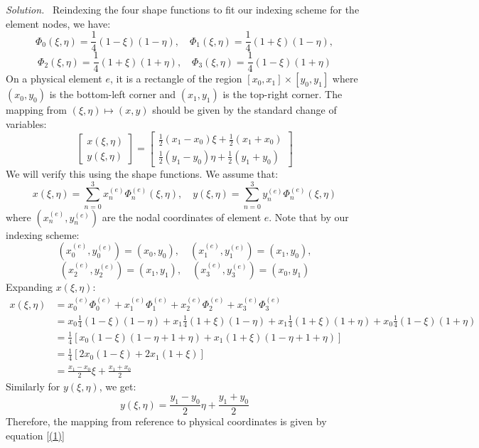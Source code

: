 \documentclass[12pt]{article}
\newcommand{\solution}
    {\par\vspace{0.5em}\noindent\emph{Solution.}\ }
    {\par\vspace{1em}}
\begin{document}
\solution
Reindexing the four shape functions to fit our indexing scheme for the element nodes, we have:
\[\Phi_0(\xi,\eta) = \frac{1}{4}(1-\xi)(1-\eta), \quad \Phi_1(\xi,\eta) = \frac{1}{4}(1+\xi)(1-\eta),\]
\[\Phi_2(\xi,\eta) = \frac{1}{4}(1+\xi)(1+\eta), \quad \Phi_3(\xi,\eta) = \frac{1}{4}(1-\xi)(1+\eta)\]
On a physical element $e$, it is a rectangle of the region $[x_0, x_1] \times [y_0, y_1]$ where $(x_0, y_0)$ is the bottom-left corner and $(x_1, y_1)$ is the top-right corner. The mapping from $(\xi,\eta) \mapsto (x,y)$ should be given by the standard change of variables:
\[\begin{bmatrix}
x(\xi,\eta) \\y(\xi,\eta)
\end{bmatrix}
=
\begin{bmatrix}
\frac{1}{2}(x_1 - x_0) \xi + \frac{1}{2}(x_1 + x_0) \\
\frac{1}{2}(y_1 - y_0) \eta + \frac{1}{2}(y_1 + y_0)
\end{bmatrix} \label{(1)} \tag{1}\]
We will verify this using the shape functions. We assume that:
\[x(\xi,\eta) = \sum_{n=0}^{3} x_n^{(e)} \Phi_n^{(e)}(\xi,\eta), \quad y(\xi,\eta) = \sum_{n=0}^{3} y_n^{(e)} \Phi_n^{(e)}(\xi,\eta)\]
where $(x_n^{(e)}, y_n^{(e)})$ are the nodal coordinates of element $e$. Note that by our indexing scheme:
\[(x_0^{(e)}, y_0^{(e)}) = (x_0, y_0), \quad (x_1^{(e)}, y_1^{(e)}) = (x_1, y_0),\]
\[(x_2^{(e)}, y_2^{(e)}) = (x_1, y_1), \quad (x_3^{(e)}, y_3^{(e)}) = (x_0, y_1)\]
Expanding $x(\xi,\eta)$:
\begin{align*}
x(\xi,\eta) &= x_0^{(e)} \Phi_0^{(e)} + x_1^{(e)} \Phi_1^{(e)} + x_2^{(e)} \Phi_2^{(e)} + x_3^{(e)} \Phi_3^{(e)}\\
&= x_0 \frac{1}{4}(1-\xi)(1-\eta) + x_1 \frac{1}{4}(1+\xi)(1-\eta) + x_1 \frac{1}{4}(1+\xi)(1+\eta) + x_0 \frac{1}{4}(1-\xi)(1+\eta)\\
&= \frac{1}{4} \left[ x_0(1-\xi)(1-\eta +1+\eta) + x_1(1+\xi)(1-\eta + 1+\eta) \right]\\
&= \frac{1}{4} \left[ 2x_0(1-\xi) + 2x_1(1+\xi) \right]\\
&= \frac{x_1 - x_0}{2} \xi + \frac{x_1 + x_0}{2}
\end{align*}
Similarly for $y(\xi,\eta)$, we get:
\[y(\xi,\eta) = \frac{y_1 - y_0}{2} \eta + \frac{y_1 + y_0}{2}\]
Therefore, the mapping from reference to physical coordinates is given by equation \ref{(1)}
\end{document}
